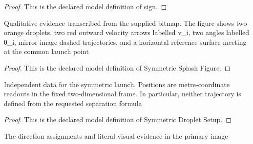 \begin{proof}
  This is the declared model definition of sign.
\end{proof}
\begin{definition}
  \label{def:physics:phyx-mini-0691:phyxminiproblems-problemphyxmini0691-symmetricsplashfigure}
  Qualitative evidence transcribed from the supplied bitmap. The figure shows two orange droplets, two red outward velocity arrows labelled v\_i, two angles labelled θ\_i, mirror-image dashed trajectories, and a horizontal reference surface meeting at the common launch point
\end{definition}
\begin{proof}
  This is the declared model definition of Symmetric Splash Figure.
\end{proof}
\begin{definition}
  \label{def:physics:phyx-mini-0691:phyxminiproblems-problemphyxmini0691-symmetricdropletsetup}
  Independent data for the symmetric launch. Positions are metre-coordinate readouts in the fixed two-dimensional frame. In particular, neither trajectory is defined from the requested separation formula
\end{definition}
\begin{proof}
  This is the declared model definition of Symmetric Droplet Setup.
\end{proof}
\begin{definition}
  \label{def:physics:phyx-mini-0691:phyxminiproblems-problemphyxmini0691-matchesprimaryfigure}
  The direction assignments and literal visual evidence in the primary image
\end{definition}

